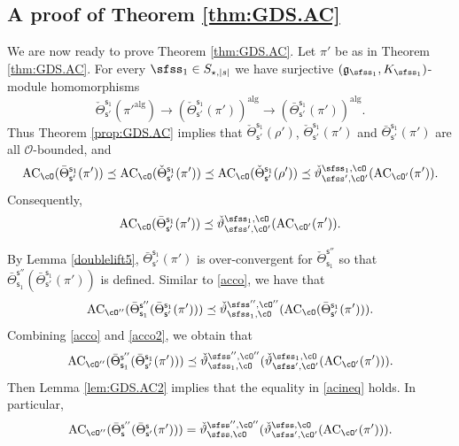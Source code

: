 \documentclass[12pt,a4paper]{amsart}
\def\abs#1{\left|{#1}\right|}
\newcommand{\CO}{{\mathcal {O}}}
\newcommand{\g}{\mathfrak g}
\newcommand{\be}{\begin {equation}}
\newcommand{\ee}{\end {equation}}
\numberwithin{equation}{section}
\theoremstyle{remark}
\def\Thetab{\bar{\Theta}}
\begin{document}
\subsection{A proof of Theorem \ref{thm:GDS.AC}}
 We are now ready to prove Theorem \ref{thm:GDS.AC}.
Let $\pi'$ be as in Theorem \ref{thm:GDS.AC}.
For every $\sfss_1\in S_{\star, \abs{s}}$ we have
surjective $(\g_{\sfss_1}, K_{\sfss_1})$-module homomorphisms
\[
\check \Theta_{\mathsf s'}^{\mathsf s_1}(\pi'^{\mathrm{alg}})\rightarrow \left (\check \Theta_{\mathsf s'}^{\mathsf s_1}(\pi')\right )^{\mathrm{alg}}\rightarrow
 \left (\Thetab_{\mathsf s'}^{\mathsf s_1}(\pi')\right )^{\mathrm{alg}}.
 \]
 Thus Theorem \ref{prop:GDS.AC} implies that  $\check \Theta_{\mathsf s'}^{\mathsf s_1}(\rho')$, $\check \Theta_{\mathsf s'}^{\mathsf s_1}(\pi')$ and $\Thetab_{\mathsf s'}^{\mathsf s_1}(\pi')$ are all $\CO$-bounded,  and
    \be\label{ineq000}
   \mathrm{AC}_{\cO}( \Thetab_{\mathsf s'}^{\mathsf s_1}(\pi'))\preceq  \mathrm{AC}_{\cO}(\check \Theta_{\mathsf s'}^{\mathsf s_1}(\pi'))\preceq  \mathrm{AC}_{\cO}(\check \Theta_{\mathsf s'}^{\mathsf s_1}(\rho'))\preceq \check \vartheta_{\sfss', \cO'}^{\sfss_1, \cO}(\mathrm{AC}_{\cO'}(\pi')).
  \ee
  Consequently,
   \be\label{acco}
   \mathrm{AC}_{\cO}( \Thetab_{\mathsf s'}^{\mathsf s_1}(\pi'))\preceq   \check \vartheta_{\sfss', \cO'}^{\sfss_1, \cO}(\mathrm{AC}_{\cO'}(\pi')).
  \ee

By Lemma \ref{doublelift5},  $ \Thetab_{\mathsf s'}^{\mathsf s_1}(\pi')$ is over-convergent for $ \check \Theta_{\mathsf s_1}^{\mathsf s''}$ so that $\Thetab_{\mathsf s_1}^{\mathsf s''}( \Thetab_{\mathsf s'}^{\mathsf s_1}(\pi'))$ is defined.  Similar to \eqref{acco}, we have that
   \be\label{acco2}
   \mathrm{AC}_{\cO''}( \Thetab_{\mathsf s_1}^{\mathsf s''}(\Thetab_{\mathsf s'}^{\mathsf s_1}(\pi')))\preceq   \check \vartheta_{\sfss_1, \cO}^{\sfss'', \cO''}(\mathrm{AC}_{\cO}( \Thetab_{\mathsf s'}^{\mathsf s_1}(\pi'))).
  \ee
Combining \eqref{acco} and \eqref{acco2}, we obtain that
\be\label{acineq}
   \mathrm{AC}_{\cO''}( \Thetab_{\mathsf s_1}^{\mathsf s''}(\Thetab_{\mathsf s'}^{\mathsf s_1}(\pi')))\preceq   \check \vartheta_{\sfss_1, \cO}^{\sfss'', \cO''}(\check \vartheta_{\sfss', \cO'}^{\sfss_1, \cO}(\mathrm{AC}_{\cO'}(\pi'))).
\ee
Then Lemma \ref{lem:GDS.AC2} implies that the equality in \eqref{acineq} holds. In particular,
\be\label{acineq2}
   \mathrm{AC}_{\cO''}( \Thetab_{\mathsf s}^{\mathsf s''}(\Thetab_{\mathsf s'}^{\mathsf s}(\pi')))=  \check \vartheta_{\sfss, \cO}^{\sfss'', \cO''}(\check \vartheta_{\sfss', \cO'}^{\sfss, \cO}(\mathrm{AC}_{\cO'}(\pi'))).
\ee
\end{document}
